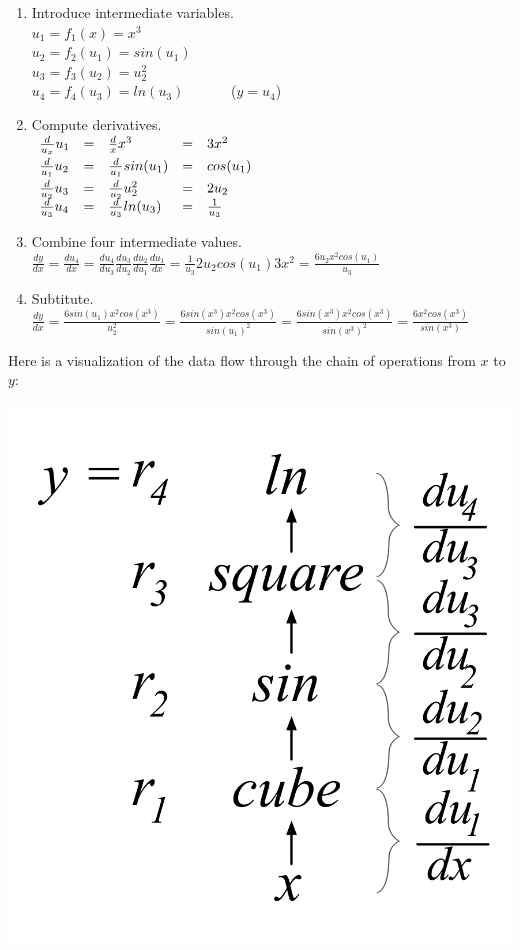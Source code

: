 \documentclass[11pt]{article}
\begin{document}
\begin{enumerate}
	\item Introduce intermediate variables.\\
$u_1 = f_1(x) = x^3$\\
$u_2 = f_2(u_1) = sin(u_1)$\\
$u_3 = f_3(u_2) = u_2^2$\\
$u_4 = f_4(u_3) = ln(u_3)$ ~~~~~~($y = u_4$)
	\item Compute derivatives.\\
$\begin{array}{lllll}
\vspace{1mm}
\frac{d}{u_x} u_1 & = & \frac{d}{x} x^3 & = & 3x^2\\
\vspace{1mm}
\frac{d}{u_1} u_2 & = & \frac{d}{u_1} sin(u_1) & = & cos(u_1) \\
\frac{d}{u_2} u_3 & = & \frac{d}{u_2} u_2^2 & =& 2u_2\\
\frac{d}{u_3} u_4 & = & \frac{d}{u_3} ln(u_3) & =& \frac{1}{u_3}\\
\end{array}$
	\item Combine four intermediate values.\\
$\frac{dy}{dx} = \frac{d u_4}{dx} = \frac{d u_4}{du_3}\frac{du_3}{d u_2} \frac{du_2}{du_1} \frac{du_1}{dx} = \frac{1}{u_3}  2u_2  cos(u_1)  3x^2 = \frac{6u_2x^2cos(u_1)}{u_3}$
	\item Subtitute.\\
$\frac{dy}{dx} = \frac{6sin(u_1)x^2cos(x^3)}{u_2^2} = \frac{6sin(x^3)x^2cos(x^3)}{sin(u_1)^2} = \frac{6sin(x^3)x^2cos(x^3)}{sin(x^3)^2} = \frac{6x^2cos(x^3)}{sin(x^3)}$
\end{enumerate}


Here is a visualization of the data flow through the chain of operations from $x$ to $y$:

\includegraphics[scale=.9]{chain-tree.png}
\end{document}
